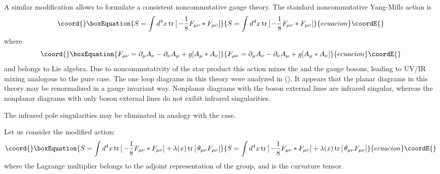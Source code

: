 \documentclass[a4paper,12pt]{article}
\providecommand{\tr}[1]{\,{\rm tr}\,#1\,}
\begin{document}
A similar modification allows to formulate a consistent noncommutative 
 \coordHE{} gauge theory. The standard noncommutative \coordHE{} Yang-Mills action 
is
\begin{equation}\coord{}\boxEquation{
S=\int d^4x \tr[- \frac{1}{8}F_{\mu \nu}*F_{\mu \nu}]
  \label{28} 
 }{
S=\int d^4x \tr[- \frac{1}{8}F_{\mu \nu}*F_{\mu \nu}]
  }{ecuacion}\coordE{}\end{equation} 
 where
 \begin{equation}\coord{}\boxEquation{ 
F_{\mu \nu}= \partial_{\mu}A_{\nu}- 
 \partial_{\nu}A_{\mu}+g[A_{\mu}*A_{\nu}]
 \label{29} 
 }{ 
F_{\mu \nu}= \partial_{\mu}A_{\nu}- 
 \partial_{\nu}A_{\mu}+g[A_{\mu}*A_{\nu}]
 }{ecuacion}\coordE{}\end{equation} 
 and \coordHE{} belongs to \coordHE{} Lie algebra. Due to noncommutativity of 
the star product this action mixes the \coordHE{} and the \coordHE{} gauge 
bosons, leading to UV/IR mixing analogous to the pure \coordHE{} case. The one 
loop diagrams in this theory were analyzed in (\cite{AA}). It 
appears that the planar diagrams in this theory may be 
renormalized in a gauge invariant way. Nonplanar 
diagrams with the \coordHE{} boson external lines are infrared 
singular, whereas the nonplanar diagrams with only \coordHE{} 
boson external lines do not exibit infrared singularities.

The infrared pole singularities may be eliminated in analogy with the 
\coordHE{} case.
 
 Let us consider the modified \coordHE{} action:
 \begin{equation}\coord{}\boxEquation{ 
 S= \int d^4x \tr[- \frac{1}{8}F_{\mu \nu}*F_{\mu \nu}]+ \lambda(x) 
\tr[\theta_{\mu \nu}F_{\mu \nu}] \label{30} 
}{ 
 S= \int d^4x \tr[- \frac{1}{8}F_{\mu \nu}*F_{\mu \nu}]+ \lambda(x) 
\tr[\theta_{\mu \nu}F_{\mu \nu}] }{ecuacion}\coordE{}\end{equation} 
 where the Lagrange multiplier \coordHE{} belongs to the adjoint 
 representation of the \coordHE{} group, and \coordHE{} is the 
\coordHE{} curvature tensor.
 
\end{document}
